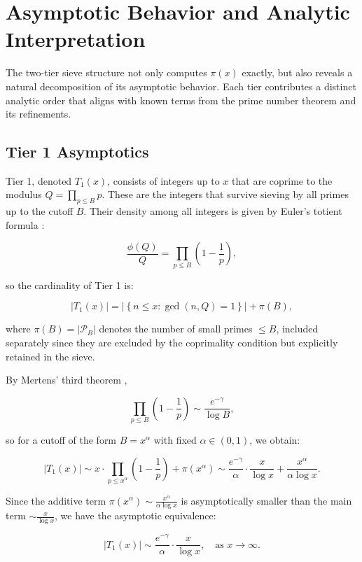 \documentclass[11pt]{article}
\begin{document}
	
	\section{Asymptotic Behavior and Analytic Interpretation}
	
	The two-tier sieve structure not only computes $\pi(x)$ exactly, but also reveals a natural decomposition of its asymptotic behavior. Each tier contributes a distinct analytic order that aligns with known terms from the prime number theorem and its refinements.
	
	\subsection{Tier 1 Asymptotics}
	
	Tier 1, denoted \( T_1(x) \), consists of integers up to \( x \) that are coprime to the modulus \( Q = \prod_{p \leq B} p \). These are the integers that survive sieving by all primes up to the cutoff \( B \). Their density among all integers is given by Euler’s totient formula \cite[Sec.~2.6]{apostol}:
	
	\[
	\frac{\phi(Q)}{Q} = \prod_{p \leq B} \left(1 - \frac{1}{p} \right),
	\]
	
	so the cardinality of Tier 1 is:
	
	\[
	|T_1(x)| = \left| \left\{ n \le x : \gcd(n, Q) = 1 \right\} \right| + \pi(B),
	\]
	
	where \( \pi(B) = |\mathcal{P}_B| \) denotes the number of small primes \( \leq B \), included separately since they are excluded by the coprimality condition but explicitly retained in the sieve.
	
	By Mertens' third theorem \cite[Theorem 4.8, p.~88]{apostol},
	
	\[
	\prod_{p \leq B} \left(1 - \frac{1}{p} \right) \sim \frac{e^{-\gamma}}{\log B},
	\]
	
	so for a cutoff of the form \( B = x^\alpha \) with fixed \( \alpha \in (0, 1) \), we obtain:
	
	\[
	|T_1(x)| \sim x \cdot \prod_{p \leq x^\alpha} \left(1 - \frac{1}{p} \right) + \pi(x^\alpha)
	\sim \frac{e^{-\gamma}}{\alpha} \cdot \frac{x}{\log x} + \frac{x^\alpha}{\alpha \log x}.
	\]
	
	Since the additive term \( \pi(x^\alpha) \sim \frac{x^\alpha}{\alpha \log x} \) is asymptotically smaller than the main term \( \sim \frac{x}{\log x} \), we have the asymptotic equivalence:
	
	\[
	|T_1(x)| \sim \frac{e^{-\gamma}}{\alpha} \cdot \frac{x}{\log x}, \quad \text{as } x \to \infty.
	\]
	
\end{document}

